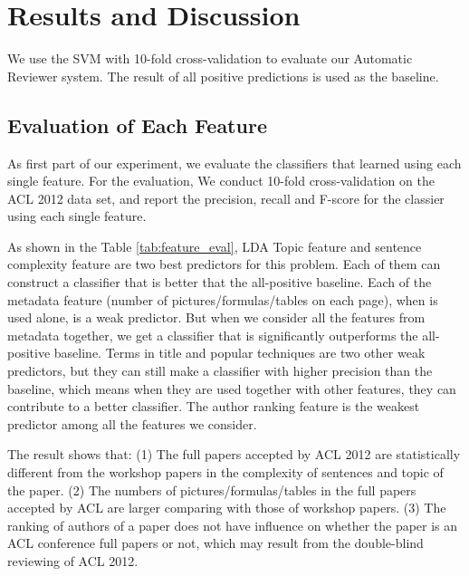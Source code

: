 \documentclass[11pt,letterpaper]{article}
\begin{document}
\section{Results and Discussion}
We use the SVM with 10-fold cross-validation to evaluate our Automatic Reviewer system. The result of all positive predictions is used as the baseline. 


\subsection{Evaluation of Each Feature}
\label{sec:feature_eval}
As first part of our experiment, 
we evaluate the classifiers that learned using each single feature.
For the evaluation,
We conduct 10-fold cross-validation on the ACL 2012 data set,
and report the precision, recall and F-score for the classier using each single feature.

As shown in the Table \ref{tab:feature_eval},
LDA Topic feature and sentence complexity feature are two best predictors for this problem.
Each of them can construct a classifier that is better that the all-positive baseline.
Each of the metadata feature (number of pictures/formulas/tables on each page),
when is used alone, is a weak predictor.
But when we consider all the features from metadata together,
we get a classifier that is significantly outperforms the all-positive baseline.
Terms in title and popular techniques are two other weak predictors,
but they can still make a classifier with higher precision than the baseline,
which means when they are used together with other features, they can contribute to a better classifier.
The author ranking feature is the weakest predictor among all the features we consider.

The result shows that:
(1) The full papers accepted by ACL 2012 are statistically 
different from the workshop papers in the complexity of sentences and topic of the paper.
(2) The numbers of pictures/formulas/tables in the full papers accepted by ACL are larger
comparing with those of workshop papers.
(3) The ranking of authors of a paper does not have influence on whether the paper 
is an ACL conference full papers or not, 
which may result from the double-blind reviewing of ACL 2012. 
\end{document}
